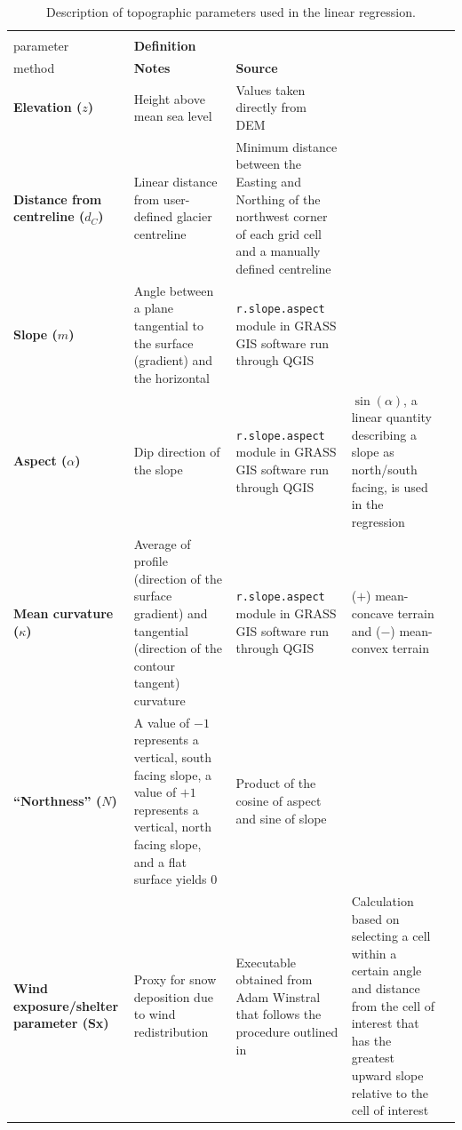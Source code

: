 \documentclass[onecolumn, letterpaper]{igs}
\begin{document}
\begin{landscape}
\begin{table}[H]
\begin{threeparttable}
\caption{Description of topographic parameters used in the linear regression.}
\label{tab:TopoParams}
\begin{tabularx}{24cm}{XXXXX}

\midrule
\textbf{\begin{tabular}[c]{@{}l@{}}Topographic\\ parameter\end{tabular}} & \textbf{Definition} & \textbf{\begin{tabular}[c]{@{}l@{}}Calculation \\ method\end{tabular}} & \textbf{Notes} & \textbf{Source} \\ \midrule
\textbf{Elevation ($z$)} & Height above mean sea level & Values taken directly from DEM &  &  \\ \midrule
\textbf{Distance from centreline ($d_C$)} & Linear distance from user-defined glacier centreline & Minimum distance between the Easting and Northing of the northwest corner of each grid cell and a manually defined centreline &  &  \\ \midrule
\textbf{Slope ($m$)} & Angle between a plane tangential to the surface (gradient) and the horizontal & \texttt{r.slope.aspect} module in GRASS GIS software run through QGIS &  & \cite{Mitavsova1993, Hofierka2009, Olaya2009} \\ \midrule
\textbf{Aspect ($\alpha$)} & Dip direction of the slope & \texttt{r.slope.aspect} module in GRASS GIS software run through QGIS & $\sin(\alpha)$, a linear quantity describing a slope as north/south facing, is used in the regression & \cite{Mitavsova1993, Hofierka2009, Olaya2009} \\ \midrule
\textbf{Mean curvature ($\kappa$)} & Average of profile (direction of the surface gradient) and tangential (direction of the contour tangent) curvature & \texttt{r.slope.aspect} module in GRASS GIS software run through QGIS & ($+$) mean-concave terrain and ($-$) mean-convex terrain & \cite{Mitavsova1993, Hofierka2009, Olaya2009} \\ \midrule
\textbf{``Northness'' ($N$)} & A value of $-1$ represents a vertical, south facing slope, a value of $+1$ represents a vertical, north facing slope, and a flat surface yields 0 & Product of the cosine of aspect and sine of slope &  & \citep{Molotch2005} \\ \midrule
\textbf{Wind exposure/shelter parameter (Sx)} & Proxy for snow deposition due to wind redistribution & Executable obtained from Adam Winstral that follows the procedure outlined in \cite{Winstral2002} & Calculation based on selecting a cell within a certain angle and distance from the cell of interest that has the greatest upward slope relative to the cell of interest & \citep{Winstral2002}
\end{tabularx}
\end{threeparttable}
\end{table}
\end{landscape}
\end{document}
